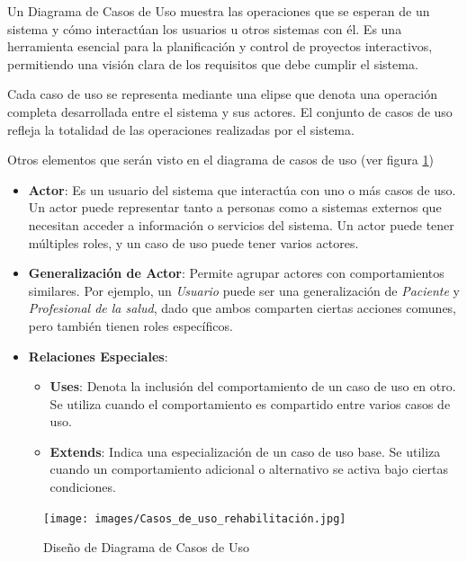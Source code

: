 \documentclass{article}
\begin{document}
Un Diagrama de Casos de Uso muestra las operaciones que se esperan de un sistema y cómo interactúan los usuarios u otros sistemas con él. Es una herramienta esencial para la planificación y control de proyectos interactivos, permitiendo una visión clara de los requisitos que debe cumplir el sistema.

Cada caso de uso se representa mediante una elipse que denota una operación completa desarrollada entre el sistema y sus actores. El conjunto de casos de uso refleja la totalidad de las operaciones realizadas por el sistema.

Otros elementos que serán visto en el diagrama de casos de uso (ver figura \ref{fig:requisitos_diagrama})

\begin{itemize}
	\item \textbf{Actor}: Es un usuario del sistema que interactúa con uno o más casos de uso. Un actor puede representar tanto a personas como a sistemas externos que necesitan acceder a información o servicios del sistema. Un actor puede tener múltiples roles, y un caso de uso puede tener varios actores.
	
	\item \textbf{Generalización de Actor}: Permite agrupar actores con comportamientos similares. Por ejemplo, un \textit{Usuario} puede ser una generalización de \textit{Paciente} y \textit{Profesional de la salud}, dado que ambos comparten ciertas acciones comunes, pero también tienen roles específicos.
	
	\item \textbf{Relaciones Especiales}:
	\begin{itemize}
		\item \textbf{Uses}: Denota la inclusión del comportamiento de un caso de uso en otro. Se utiliza cuando el comportamiento es compartido entre varios casos de uso.
		\item \textbf{Extends}: Indica una especialización de un caso de uso base. Se utiliza cuando un comportamiento adicional o alternativo se activa bajo ciertas condiciones.
	\end{itemize}
\end{itemize}

\begin{figure}[h!]
	\begin{center} 
		\texttt{[image: images/Casos\_de\_uso\_rehabilitación.jpg]}
		\caption{Diseño de Diagrama de Casos de Uso}
		\label{fig:requisitos_diagrama}
	\end{center}
\end{figure}
\end{document}
